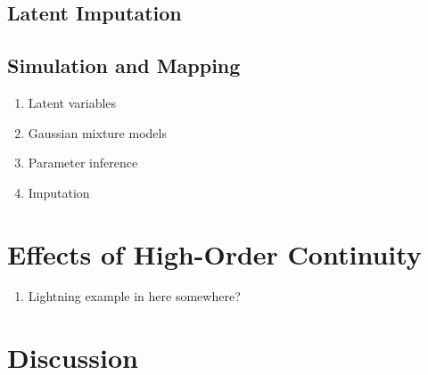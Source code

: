 \FloatBarrier
\subsection{Latent Imputation}
\label{subsec:03impute}

\FloatBarrier
\subsection{Simulation and Mapping}
\label{subsec:03simulate}

\begin{enumerate}
    \item Latent variables
    \item Gaussian mixture models
    \item Parameter inference
    \item Imputation
\end{enumerate}

\FloatBarrier
\section{Effects of High-Order Continuity}
\label{sec:03effect}

\begin{enumerate}
    \item Lightning example in here somewhere?
\end{enumerate}

\FloatBarrier
\section{Discussion}
\label{sec:03discuss}